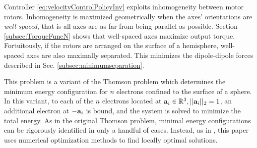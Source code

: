 Controller \eqref{eq:velocityControlPolicyInv} exploits inhomogeneity between motor rotors.   %
Inhomogeneity is maximized geometrically when the axes' orientations are \emph{well spaced}, that is all axes are as far from being parallel as possible. Section \ref{subsec:TorqueFuncN} shows that well-spaced axes maximize output torque. Fortuitously, if the rotors are arranged on the surface of a hemisphere, well-spaced axes are also maximally separated.  This minimizes the dipole-dipole forces described in Sec. \ref{subsec:minimumseparation}.  

This problem is a variant of the Thomson problem \cite{Thomson1904} which determines the minimum energy configuration for $n$ electrons confined to the surface of a sphere.  In this variant, to each of the $n$ electrons located at ${\bf{a}}_i\in \mathbb{R}^{3}, ||{\bf{a}}_i||_2=1$, an additional electron at $-{\bf{a}}_i$ is bound, and the system is solved to minimize the total energy.  As in the original Thomson problem, minimal energy configurations can be rigorously identified in only a handful of cases. Instead, as in \cite{Peng2012}, this paper uses numerical optimization methods to find locally optimal solutions.

